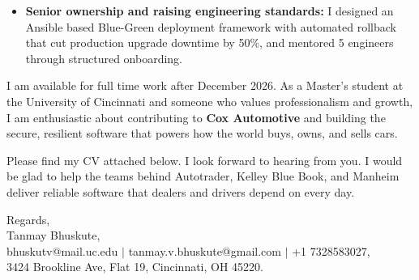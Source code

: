 \documentclass[11pt]{letter}
\begin{document}
\begin{letter}{}
\begin{itemize}[leftmargin=*, itemsep=0.45em]
    \item \textbf{Senior ownership and raising engineering standards:} I designed an Ansible based Blue-Green deployment framework with automated rollback that cut production upgrade downtime by 50\%, and mentored 5 engineers through structured onboarding.
\end{itemize}

I am available for full time work after December 2026. As a Master's student at the University of Cincinnati and someone who values professionalism and growth, I am enthusiastic about contributing to \textbf{Cox Automotive} and building the secure, resilient software that powers how the world buys, owns, and sells cars.

Please find my CV attached below. I look forward to hearing from you. I would be glad to help the teams behind Autotrader, Kelley Blue Book, and Manheim deliver reliable software that dealers and drivers depend on every day.

{\setlength{\parskip}{0pt}
Regards,\\
Tanmay Bhuskute,\\
bhuskutv@mail.uc.edu $\mid$ tanmay.v.bhuskute@gmail.com $\mid$ +1 7328583027,\\
3424 Brookline Ave, Flat 19, Cincinnati, OH 45220.
}

\end{letter}
\end{document}

